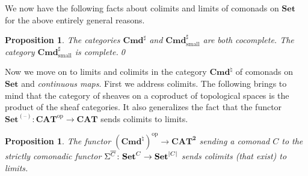\documentclass[11pt, oneside, article]{memoir}
\theoremstyle{plain}
\newtheorem{proposition}[theorem]{Proposition}
\theoremstyle{definition}
\theoremstyle{remark}
\DeclareMathOperator{\ophelper}{op}
\DeclarePairedDelimiter{\abs}{\lvert}{\rvert}
\newcommand{\dash}{{\mathord{\text{--}}}}
\newcommand{\op}{^{\ophelper}}
\newcommand{\namedcat}[1]{\mathbf{#1}}
\newcommand{\Set}{\namedcat{Set}}
\newcommand{\CAT}{\namedcat{CAT}}
\newcommand{\Com}{\namedcat{Cmd}^\sharp}
\newcommand{\ComSet}{\Com}
\newcommand{\Con}{\namedcat{Cmd}^\natural}
\newcommand{\ConSet}{\Con}
\newcommand{\ConO}{\Con}
\newcommand{\ConOSet}{\ConO}
\newcommand{\CoalgOn}[2]{{#2}^{#1}}
\newcommand{\CoalgSet}[1]{\CoalgOn{#1}{\Set}}
\newcommand{\clift}[1]{\overline{#1}}
\newcommand{\pts}[1]{{\abs{#1}}}
\newcommand{\carr}{\Sigma}
\newcommand{\arro}{\mathbf{2}}
\newcommand{\car}[1]{\carr^{#1}}
\newcommand{\fun}[2]{{#2}^{#1}}
\newcommand{\AccCom}{\Com_{\mathrm{small}}}
\newcommand{\AccComSet}{\AccCom}
\newcommand{\cmnd}[1]{{#1}}
\newcommand{\cC}{\cmnd{C}}
\newcommand{\CSet}{\CoalgSet{\cC}}
\newcommand{\SetC}{\Set/\pts{\cC}}
\newcommand{\SetpC}{\Set^\pts{\cC}}
\begin{document}

We now have the following facts about colimits and limits of comonads
on $\Set$ for the above entirely general reasons.

\begin{proposition}\label{prop:comlimits}
  The categories $\ComSet$ and $\AccComSet$ are both cocomplete.
  The category $\AccComSet$ is complete.\qed
\end{proposition}

Now we move on to limits and colimits in the category $\ConSet$ of
comonads on $\Set$ and \emph{continuous maps}.  First we address
colimits. The following brings to mind that the category of sheaves on
a coproduct of topological spaces is the product of the sheaf
categories. It also generalizes the fact that the functor
$\fun{(\dash)}{\Set} \colon \CAT\op \to \CAT$ sends colimits to
limits.

\begin{proposition}\label{prop:contcolimits}
  The functor $(\ConOSet)\op \to \CAT^\arro$ sending a comonad $\cC$ to the
  strictly comonadic functor
  $\car{\clift{\cC}} \colon \CSet \to \SetpC$ sends colimits (that
  exist) to limits.
\end{proposition}

\end{document}
